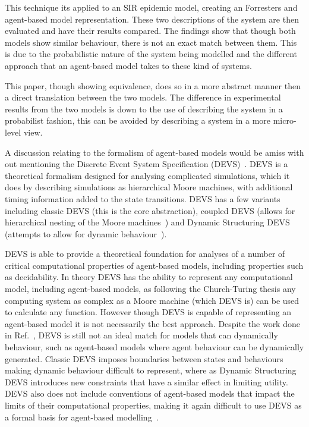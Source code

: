 \documentclass{article}
\begin{document}
This technique its applied to an SIR epidemic model, creating an Forrester\textsc{}s and agent-based model representation. These two descriptions of the system are then evaluated and have their results compared. The findings show that though both models show similar behaviour, there is not an exact match between them. This is due to the probabilistic nature of the system being modelled and the different approach that an agent-based model takes to these kind of systems. 

This paper, though showing equivalence, does so in a more abstract manner then a direct translation between the two models. The difference in experimental results from the two models is down to the use of describing the system in a probabilist fashion, this can be avoided by describing a system in a more micro-level view.    

A discussion relating to the formalism of agent-based models would be amiss with out mentioning the Discrete Event System Specification (DEVS)~\cite{introdevs}. DEVS is a theoretical formalism designed for analysing complicated simulations, which it does by describing simulations as hierarchical Moore machines, with additional timing information added to the state transitions. DEVS has a few variants including classic DEVS (this is the core abstraction), coupled DEVS (allows for hierarchical nesting of the Moore machines~\cite{coupleddevs}) and Dynamic Structuring DEVS (attempts to allow for dynamic behaviour~\cite{dynamicdevs}).

DEVS is able to provide a theoretical foundation for analyses of a number of critical computational properties of agent-based models, including properties such as decidability. In theory DEVS has the ability to represent any computational model, including agent-based models, as following the Church-Turing thesis any computing system as complex as a Moore machine (which DEVS is) can be used to calculate any function. However though DEVS is capable of representing an agent-based model it is not necessarily the best approach. Despite the work done in Ref.~\cite{dynamicdevs}, DEVS is still not an ideal match for models that can dynamically behaviour, such as agent-based models where agent behaviour can be dynamically generated. Classic DEVS imposes boundaries between states and behaviours making dynamic behaviour difficult to represent, where as Dynamic Structuring DEVS introduces new constraints that have a similar effect in limiting utility. DEVS also does not include conventions of agent-based models that impact the limits of their computational properties, making it again difficult to use DEVS as a formal basis for agent-based modelling~\cite{taabm}.  
\end{document}
